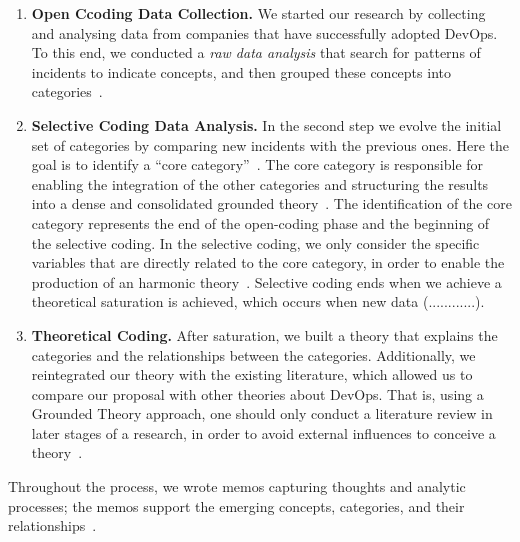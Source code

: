 \begin{enumerate}[label=(\Alph*)]
\item {\bf Open Ccoding Data Collection.} We started our research 
  by collecting and analysing data from companies that have successfully adopted DevOps. 
  To this end, we conducted a \emph{raw data analysis} that search for patterns of 
  incidents to indicate concepts,  and then grouped these concepts into 
  categories~\cite{stol2016grounded}.

\item {\bf Selective Coding Data Analysis.} In the second step we evolve 
  the initial set of 
  categories by comparing new incidents with the previous ones. Here the goal is 
  to identify a ``core category''~\cite{stol2016grounded}.
  The core category is responsible for enabling the integration of the other
  categories and structuring the results into a dense and consolidated grounded
  theory~\cite{jantunen2014using}. The identification of the core category
  represents the end of the open-coding phase and the beginning of the selective coding.
  In the selective coding, we only consider the specific variables that are directly 
  related to the core category, in order to enable the production of an harmonic
  theory~\cite{coleman2007using,hoda2011impact}. Selective coding ends when we 
  achieve a theoretical saturation is achieved, {\color{red}which occurs when new data (............).}

\item {\bf Theoretical Coding.} After saturation, we built a theory that explains 
 the categories and the relationships between the categories. Additionally, we reintegrated 
 our theory with the existing literature, {\color{red}which allowed us to compare our proposal 
 with other theories about DevOps}. That is, using a Grounded Theory approach, 
 one should only conduct a literature review in later stages of a research,  
in order to avoid external influences to conceive a theory~\cite{adolph2012reconciling}.

\end{enumerate}

Throughout the process, we wrote memos capturing thoughts and analytic
processes; the memos support the emerging concepts, categories, and their
relationships~\cite{adolph2012reconciling}.



